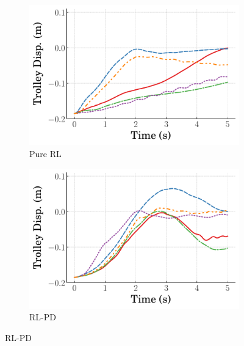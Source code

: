 \begin{figure}[h!]
    \centering
    \begin{subfigure}[b]{0.49\textwidth}
        \centering
        \includegraphics[width=\textwidth]{figures/figures_RL_model_based_control/time_responses_crane/dpcrane_pure_RL/Cart_displacement_-0p185_init_300000_steps.pdf}
        \caption{Pure RL}
        \label{subfig_chap2:dpcrane_neg_trolley_resp_300000steps_pure_RL}
    \end{subfigure}
    \hfill
    \begin{subfigure}[b]{0.49\textwidth}
	    \centering
	    \includegraphics[width=\textwidth]{figures/figures_RL_model_based_control/time_responses_crane/dpcrane_cont_gain_sched/Cart_displacement_-0p185_init_300000_steps.pdf}
	    \caption{RL-PD}
	    \label{subfig_chap2:dpcrane_neg_trolley_resp_300000steps_gain_sched}
    \end{subfigure}

\end{figure}
